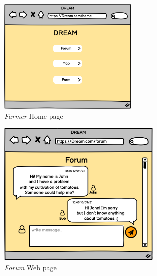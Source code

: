 \begin{figure}[H]
    \begin{center}
    \includegraphics[width=0.6\textwidth]{mocups/FHome.png}
    \caption{\emph{Farmer} Home page}
    \label{fig:homepage}
    \end{center}
\end{figure}

\begin{figure}[H]
    \begin{center}
    \includegraphics[width=0.7\textwidth]{mocups/Forum.png}
    \caption{\emph{Forum} Web page}
    \label{fig:forum}
    \end{center}
\end{figure}

